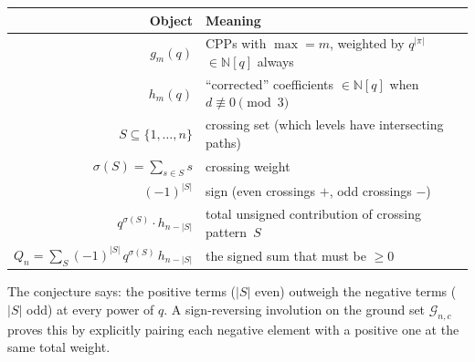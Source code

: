 \documentclass[11pt]{article}
\newcommand{\N}{\mathbb{N}}
\theoremstyle{plain}
\theoremstyle{definition}
\begin{document}
\begin{center}
\renewcommand{\arraystretch}{1.4}
\begin{tabular}{r|l}
\textbf{Object} & \textbf{Meaning} \\ \hline
$g_m(q)$ & CPPs with $\max = m$, weighted by $q^{|\pi|}$
  \quad$\in \N[q]$ always \\
$h_m(q)$ & ``corrected'' coefficients
  \quad$\in \N[q]$ when $d \not\equiv 0 \pmod{3}$ \\
$S \subseteq \{1, \ldots, n\}$ & crossing set
  (which levels have intersecting paths) \\
$\sigma(S) = \sum_{s \in S} s$ & crossing weight \\
$(-1)^{|S|}$ & sign (even crossings $+$, odd crossings $-$) \\
$q^{\sigma(S)} \cdot h_{n-|S|}$ & total unsigned contribution
  of crossing pattern~$S$ \\[4pt]
$Q_n = \displaystyle\sum_S (-1)^{|S|}\, q^{\sigma(S)}\, h_{n-|S|}$
  & the signed sum that must be $\geq 0$
\end{tabular}
\end{center}

\medskip
The conjecture says: the positive terms ($|S|$ even) outweigh
the negative terms ($|S|$ odd) at every power of $q$.
A sign-reversing involution on the ground set $\mathcal{G}_{n,c}$
proves this by explicitly pairing each negative element with
a positive one at the same total weight.
\end{document}
